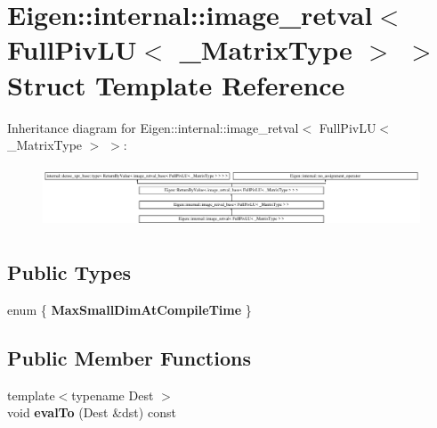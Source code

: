\hypertarget{struct_eigen_1_1internal_1_1image__retval_3_01_full_piv_l_u_3_01___matrix_type_01_4_01_4}{}\section{Eigen\+::internal\+::image\+\_\+retval$<$ Full\+Piv\+LU$<$ \+\_\+\+Matrix\+Type $>$ $>$ Struct Template Reference}
\label{struct_eigen_1_1internal_1_1image__retval_3_01_full_piv_l_u_3_01___matrix_type_01_4_01_4}
Inheritance diagram for Eigen\+::internal\+::image\+\_\+retval$<$ Full\+Piv\+LU$<$ \+\_\+\+Matrix\+Type $>$ $>$\+:\begin{figure}[H]
\begin{center}
\leavevmode
\includegraphics[height=1.860465cm]{struct_eigen_1_1internal_1_1image__retval_3_01_full_piv_l_u_3_01___matrix_type_01_4_01_4}
\end{center}
\end{figure}
\subsection*{Public Types}
\begin{DoxyCompactItemize}
\item 
\mbox{\label{struct_eigen_1_1internal_1_1image__retval_3_01_full_piv_l_u_3_01___matrix_type_01_4_01_4_a2efbd3c5490ec068ab135d8cfc956ba3}} 
enum \{ {\bfseries Max\+Small\+Dim\+At\+Compile\+Time}
 \}
\end{DoxyCompactItemize}
\subsection*{Public Member Functions}
\begin{DoxyCompactItemize}
\item 
\mbox{\label{struct_eigen_1_1internal_1_1image__retval_3_01_full_piv_l_u_3_01___matrix_type_01_4_01_4_aa8a17ec738e106df5aca51488967f525}} 
{\footnotesize template$<$typename Dest $>$ }\\void {\bfseries eval\+To} (Dest \&dst) const
\end{DoxyCompactItemize}
